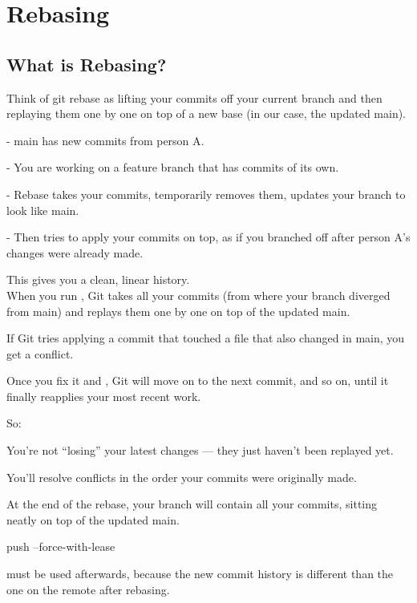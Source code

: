 \chapter{Rebasing}
\chapteroverlay
\section{What is Rebasing?}
Think of git rebase as lifting your commits off your current branch and then replaying them one by one on top of a new base (in our case, the updated main).

- main has new commits from person A.

- You are working on a feature branch that has commits of its own.

- Rebase takes your commits, temporarily removes them, updates your branch to look like main.

- Then tries to apply your commits on top, as if you branched off after person A's changes were already made.

This gives you a clean, linear history.\\

When you run , Git takes all your commits (from where your branch diverged from main) and replays them one by one on top of the updated main.

If Git tries applying a commit that touched a file that also changed in main, you get a conflict.

Once you fix it and , Git will move on to the next commit, and so on, until it finally reapplies your most recent work.

So:

You’re not “losing” your latest changes — they just haven’t been replayed yet.

You’ll resolve conflicts in the order your commits were originally made.

At the end of the rebase, your branch will contain all your commits, sitting neatly on top of the updated main.

\begin{gitBashBox}
push --force-with-lease 
\end{gitBashBox}
must be used afterwards, because the new commit history is different than the one on the remote after rebasing.